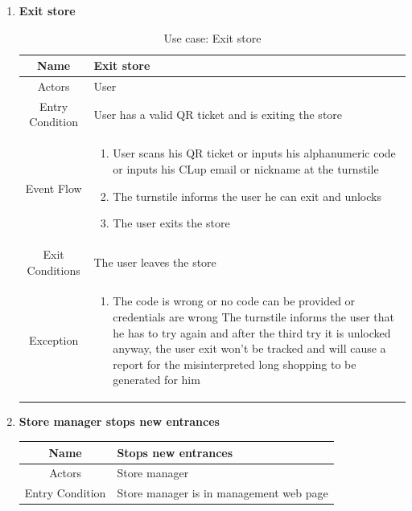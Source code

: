 \begin{enumerate}
\item \textbf{Exit store}

\begin{table}[H]
	{
		\begin{tabular}{|c|p{14cm}|}
			\hline
			Name & Exit store\\
			\hline
			Actors & User\\
			\hline
			Entry Condition & User has a valid QR ticket and is exiting the store\\
			\hline
			
			Event Flow & \begin{enumerate}
				\item User scans his QR ticket or inputs his alphanumeric code or inputs his CLup email or nickname at the turnstile
				\item The turnstile informs the user he can exit and unlocks
				\item The user exits the store
				
			\end{enumerate}\\
			
			\hline
			Exit Conditions & The user leaves the store\\
			\hline
			
			Exception & \begin{enumerate}
				\item The code is wrong or no code can be provided or credentials are wrong\newline
				The turnstile informs the user that he has to try again and after the third try it is unlocked anyway, the user exit won’t be tracked and will cause a report for the misinterpreted long shopping to be generated for him
				
			\end{enumerate}\\
			
			\hline
		\end{tabular}
	}
	\label{tab:UCExit}
	\caption{Use case: Exit store}
\end{table}

\item \textbf{Store manager stops new entrances}

\begin{table}[H]
	{
		\begin{tabular}{|c|p{14cm}|}
			\hline
			Name & Stops new entrances\\
			\hline
			Actors & Store manager\\
			\hline
			Entry Condition & Store manager is in management web page\\
			\hline
			

\end{tabular}}
\end{table}
\end{enumerate}
